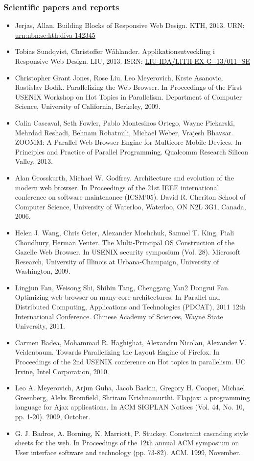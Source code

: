 \documentclass[oneside,a4paper,11pt]{kth-mag}
\begin{document}
\subsubsection*{Scientific papers and reports}
\begin{itemize}
\item Jerjas, Allan. Building Blocks of Responsive Web Design. KTH, 2013. URN: \url{urn:nbn:se:kth:diva-142345}
\item Tobias Sundqvist, Christoffer Wåhlander. Applikationsutveckling i Responsive Web Design. LIU, 2013. ISRN: \url{LIU-IDA/LITH-EX-G--13/011--SE}
\item Christopher Grant Jones, Rose Liu, Leo Meyerovich, Krste Asanovic, Rastislav Bodík. Parallelizing the Web Browser. In Proceedings of the First USENIX Workshop on Hot Topics in Parallelism. Department of Computer Science, University of California, Berkeley, 2009.
\item Calin Cascaval, Seth Fowler, Pablo Montesinos Ortego, Wayne Piekarski, Mehrdad Reshadi, Behnam Robatmili, Michael Weber, Vrajesh Bhavsar. ZOOMM: A Parallel Web Browser Engine for Multicore Mobile Devices. In Principles and Practice of Parallel Programming. Qualcomm Research Silicon Valley, 2013.
\item Alan Grosskurth, Michael W. Godfrey. Architecture and evolution of the modern web browser. In Proceedings of the 21st IEEE international conference on software maintenance (ICSM'05). David R. Cheriton School of Computer Science, University of Waterloo, Waterloo, ON N2L 3G1, Canada, 2006.
\item Helen J. Wang, Chris Grier, Alexander Moshchuk, Samuel T. King, Piali Choudhury, Herman Venter. The Multi-Principal OS Construction of the Gazelle Web Browser. In USENIX security symposium (Vol. 28). Microsoft Research, University of Illinois at Urbana-Champaign, University of Washington, 2009.
\item Lingjun Fan, Weisong Shi, Shibin Tang, Chenggang Yan2 Dongrui Fan. Optimizing web browser on many-core architectures. In Parallel and Distributed Computing, Applications and Technologies (PDCAT), 2011 12th International Conference. Chinese Academy of Sciences, Wayne State University, 2011.
\item Carmen Badea, Mohammad R. Haghighat, Alexandru Nicolau, Alexander V. Veidenbaum. Towards Parallelizing the Layout Engine of Firefox. In Proceedings of the 2nd USENIX conference on Hot topics in parallelism. UC Irvine, Intel Corporation, 2010.
\item Leo A. Meyerovich, Arjun Guha, Jacob Baskin, Gregory H. Cooper, Michael Greenberg, Aleks Bromfield, Shriram Krishnamurthi. Flapjax: a programming language for Ajax applications. In ACM SIGPLAN Notices (Vol. 44, No. 10, pp. 1-20). 2009, October.
\item G. J. Badros, A. Borning, K. Marriott, P. Stuckey. Constraint cascading style sheets for the web. In Proceedings of the 12th annual ACM symposium on User interface software and technology (pp. 73-82). ACM. 1999, November.
\end{itemize}
\end{document}
